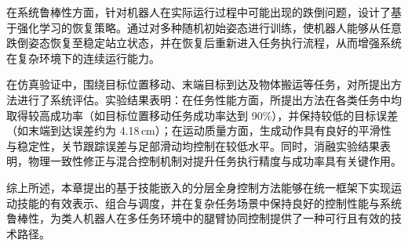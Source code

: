 在系统鲁棒性方面，针对机器人在实际运行过程中可能出现的跌倒问题，设计了基于强化学习的恢复策略。通过对多种随机初始姿态进行训练，使机器人能够从任意跌倒姿态恢复至稳定站立状态，并在恢复后重新进入任务执行流程，从而增强系统在复杂环境下的连续运行能力。

在仿真验证中，围绕目标位置移动、末端目标到达及物体搬运等任务，对所提出方法进行了系统评估。实验结果表明：在任务性能方面，所提出方法在各类任务中均取得较高成功率（如目标位置移动任务成功率达到 90\%），并保持较低的目标误差（如末端到达误差约为 4.18\,cm）；在运动质量方面，生成动作具有良好的平滑性与稳定性，关节跟踪误差与足部滑动均控制在较低水平。同时，消融实验结果表明，物理一致性修正与混合控制机制对提升任务执行精度与成功率具有关键作用。

综上所述，本章提出的基于技能嵌入的分层全身控制方法能够在统一框架下实现运动技能的有效表示、组合与调度，并在复杂任务场景中保持良好的控制性能与系统鲁棒性，为类人机器人在多任务环境中的腿臂协同控制提供了一种可行且有效的技术路径。


